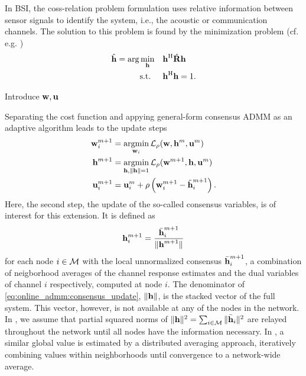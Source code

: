 \documentclass{article}
\begin{document}
In BSI, the coss-relation problem formulation uses relative information between sensor signals to identify the system, i.e., the acoustic or communication channels.
The solution to this problem is found by the minimization problem (cf. e.g. \cite{langtongBlindIdentificationEqualization1994,huangAdaptiveMultichannelLeast2002,huangClassFrequencydomainAdaptive2003})
\begin{equation}
    \begin{aligned}
        \hat{\bm{\mathrm{h}}} = \arg \min_{\bm{\mathrm{h}}} \quad &\bm{\mathrm{h}}^{\mathrm{H}} \hat{\bm{\mathrm{R}}} \bm{\mathrm{h}} \\
        \text{s.t. } \quad &\bm{\mathrm{h}}^{\mathrm{H}} \bm{\mathrm{h}} = 1.
    \end{aligned}\label{eq:frequency_domain:min_prob}
\end{equation}
\begin{todo}
    Introduce \(\bm{\mathrm{w}}, \bm{\mathrm{u}}\)
\end{todo}
Separating the cost function and appying general-form consensus ADMM as an adaptive algorithm leads to the update steps
\begin{align}
    \bm{\mathrm{w}}_i^{m+1} &= \underset{\bm{\mathrm{w}}_i}{\operatorname{argmin}} \, \mathcal{L}_{\rho} (\bm{\mathrm{w}},\bm{\mathrm{h}}^m,\bm{\mathrm{u}}^m)\label{eq:general_consensus_admm:local}\\
    \bm{\mathrm{h}}^{m+1} &= \underset{\bm{\mathrm{h}}, \|\bm{\mathrm{h}}\| = 1}{\operatorname{argmin}}\, \mathcal{L}_{\rho} (\bm{\mathrm{w}}^{m+1},\bm{\mathrm{h}},\bm{\mathrm{u}}^m)\label{eq:general_consensus_admm:global}\\
    \bm{\mathrm{u}}_i^{m+1} &= \bm{\mathrm{u}}_i^{m} + \rho \left( \bm{\mathrm{w}}_i^{m+1} - \tilde{\bm{\mathrm{h}}}_i^{m+1} \right).\label{eq:general_consensus_admm:dual}
\end{align}
Here, the second step, the update of the so-called consensus variables, is of interest for this extension.
It is defined \cite{blochbergerDBSI} as
\begin{equation}
    \bm{\mathrm{h}}_i^{m+1} = \frac{\bar{\bm{\mathrm{h}}}_i^{m+1}}{\|\bm{\mathrm{h}}^{m+1}\|}\label{eq:online_admm:consensus_update}
\end{equation}
for each node \(i \in \mathcal{M}\) with the local unnormalized consensus \(\bar{\bm{\mathrm{h}}}_i^{m+1}\), a combination of neigborhood averages of the channel response estimates and the dual variables of channel \(i\) respectively, computed at node \(i\).
The denominator of \eqref{eq:online_admm:consensus_update}, \(\|\bm{\mathrm{h}}\|\), is the stacked vector of the full system. This vector, however, is not available at any of the nodes in the network.
In \cite{blochbergerDBSI}, we assume that partial squared norms of \(\|\bm{\mathrm{h}}\|^2 = \sum_{i \in \mathcal{M}} \|\bar{\bm{\mathrm{h}}}_i\|^2\) are relayed throughout the network until all nodes have the information necessary.
In \cite{yuDistributedBlindSystem2014,liuDistributedBlindIdentification2016}, a similar global value is estimated by a distributed averaging approach, iteratively combining values within neighborhoods until convergence to a network-wide average.
\end{document}
